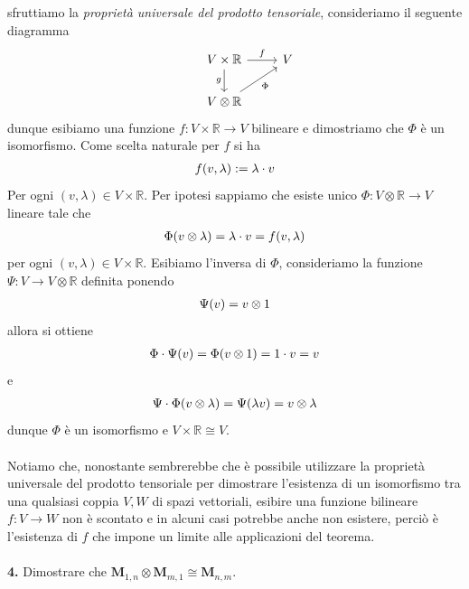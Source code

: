 \documentclass[oneside, 11pt]{amsbook}
\makeatletter
\newcommand{\0}{{(0)}}
\newcommand{\3}{{(3)}}
\theoremstyle{colonplain}
\theoremstyle{colondefinition}
\theoremstyle{colonremark}
\numberwithin{equation}{chapter}
\renewcommand{\proofname}{Dimostrazione}
\renewenvironment{proof}[1][\proofname]{\par
  \pushQED{\qed}%
  \normalfont \topsep6\p@\@plus6\p@\relax
  \trivlist
  \item[\hskip\labelsep\bfseries #1:]\ignorespaces
}{%
  \popQED\endtrivlist\@endpefalse
}
\makeatother
\begin{document}
\begin{proof} sfruttiamo la \textit{proprietà universale del prodotto tensoriale}, consideriamo il seguente diagramma \\
\[
\begin{tikzcd}
&V \times \mathbb{R} \arrow[r,"f"] \arrow[d,"g", swap] & V \\
&V \otimes \mathbb{R} \arrow[ur, "\Phi", swap] 
\end{tikzcd}
\]
dunque esibiamo una funzione $f : V \times \mathbb{R} \longrightarrow V$ bilineare e dimostriamo che $\Phi$ è un isomorfismo. Come scelta naturale per $f$ si ha
\begin{align}
    f(v, \lambda) := \lambda \cdot v \notag
\end{align}
Per ogni $(v, \lambda) \in V \times \mathbb{R}$. Per ipotesi sappiamo che esiste unico $\Phi : V \otimes \mathbb{R} \longrightarrow V$ lineare tale che
\begin{align}
    \Phi(v \otimes \lambda) = \lambda \cdot v = f(v, \lambda) \notag
\end{align}
per ogni $(v, \lambda) \in V \times \mathbb{R}$. Esibiamo l'inversa di $\Phi$, consideriamo la funzione $\Psi : V \longrightarrow V \otimes \mathbb{R}$ definita ponendo
\begin{align}
    \Psi (v) = v \otimes 1 \notag
\end{align}
allora si ottiene
\begin{align}
    \Phi \cdot \Psi (v) = \Phi(v \otimes 1) = 1 \cdot v = v \notag
\end{align}
e
\begin{align}
    \Psi \cdot \Phi (v \otimes \lambda) = \Psi (\lambda v) = v \otimes \lambda \notag
\end{align}
dunque $\Phi$ è un isomorfismo e $V \times \mathbb{R} \cong V$. \\ \\
Notiamo che, nonostante sembrerebbe che è possibile utilizzare la proprietà universale del prodotto tensoriale per dimostrare l'esistenza di un isomorfismo tra una qualsiasi coppia $V, W$ di spazi vettoriali, esibire una funzione bilineare $f : V \longrightarrow W$ non è scontato e in alcuni casi potrebbe anche non esistere, perciò è l'esistenza di $f$ che impone un limite alle applicazioni del teorema. \\ \\
\end{proof}
\textbf{4.} Dimostrare che $\mathbf{M}_{1, n} \otimes \mathbf{M}_{m, 1} \cong \mathbf{M}_{n, m}$. \\
\end{document}

